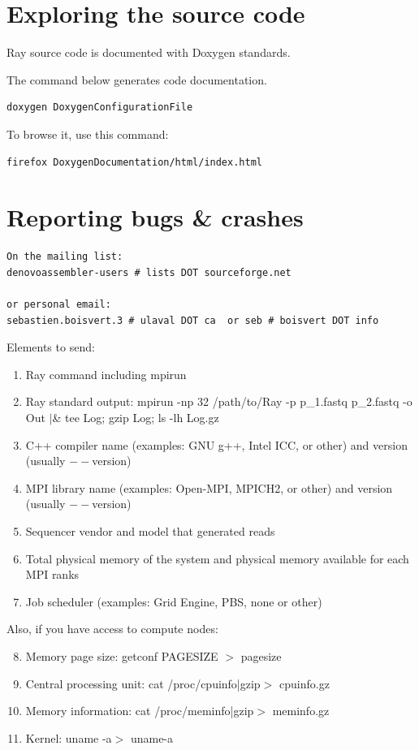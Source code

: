 \documentclass{article}
\begin{document}
\section{Exploring the source code}

Ray source code is documented with Doxygen standards.

The command below generates code documentation.

\begin{verbatim}
doxygen DoxygenConfigurationFile
\end{verbatim}

To browse it, use this command:

\begin{verbatim}
firefox DoxygenDocumentation/html/index.html
\end{verbatim}

\section{Reporting bugs \& crashes}

\begin{verbatim}
On the mailing list:
denovoassembler-users # lists DOT sourceforge.net

or personal email:
sebastien.boisvert.3 # ulaval DOT ca  or seb # boisvert DOT info
\end{verbatim}

\noindent
Elements to send:

\begin{enumerate}
 \item Ray command including mpirun
  \item Ray standard output: mpirun -np 32 /path/to/Ray -p p\_1.fastq p\_2.fastq -o Out $|$\& tee Log; gzip Log; ls -lh Log.gz
    \item  C++ compiler name (examples: GNU g++, Intel ICC, or other) and version (usually $--$version)
   \item  MPI library name (examples: Open-MPI, MPICH2, or other) and version (usually $--$version)
    \item  Sequencer vendor and model that generated reads
    \item  Total physical memory of the system and physical memory available for each MPI ranks
\item Job scheduler (examples: Grid Engine, PBS, none or other)
\end{enumerate}

\noindent
Also, if you have access to compute nodes:

\begin{enumerate}
\setcounter{enumi}{7}
   \item Memory page size: getconf PAGESIZE $>$ pagesize
   \item Central processing unit: cat /proc/cpuinfo|gzip$>$ cpuinfo.gz
   \item Memory information: cat /proc/meminfo|gzip$>$ meminfo.gz
   \item Kernel: uname -a$>$ uname-a 
\end{enumerate}
\end{document}
